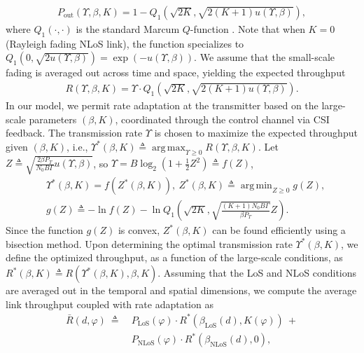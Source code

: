 \documentclass[10pt,twocolumn]{IEEEtran}
\DeclareMathOperator*{\argmax}{arg\,max}
\DeclareMathOperator*{\argmin}{arg\,min}
\begin{document}
\begin{align}
	P_{\mathrm{out}}(\Upsilon,\beta,K)=1-Q_{1}\left(\sqrt{2K},\sqrt{2(K+1)u(\Upsilon,\beta)}\right),
\end{align}
where $Q_{1}(\cdot,\cdot)$ is the standard Marcum $Q$-function \cite{Rician}. Note that when $K{=}0$ (Rayleigh fading NLoS link), the function specializes to $Q_{1}\left(0,\sqrt{2u(\Upsilon,\beta)}\right){=}\exp(-u(\Upsilon,\beta))$. We assume that the small-scale fading is averaged out across time and space, yielding the expected throughput
\begin{align}
	R(\Upsilon,\beta,K)=\Upsilon\cdot Q_{1}\left(\sqrt{2K},\sqrt{2(K+1)u(\Upsilon,\beta)}\right).
\end{align}
In our model, we permit rate adaptation at the transmitter based on the large-scale parameters $(\beta,K)$, coordinated through the control channel via CSI feedback. The transmission rate $\Upsilon$ is chosen to maximize the expected throughput given $(\beta,K)$, i.e., $\Upsilon^{*}(\beta,K){\triangleq}\argmax_{\Upsilon{\geq}0}R(\Upsilon,\beta,K)$. Let $Z{\triangleq}\sqrt{\frac{2{\beta}P_{T}}{N_{0}B\Gamma}u(\Upsilon,\beta)}$, so $\Upsilon{=}B\log_{2}\left(1{+}\frac{1}{2}Z^{2}\right){\triangleq}f(Z)$,
\begin{align}
    &\Upsilon^{*}(\beta,K){=}f(Z^{*}(\beta,K)),\ Z^{*}(\beta,K){\triangleq}\argmin_{Z{\geq}0}g(Z),\nonumber\\
    &g(Z){\triangleq}-\ln f(Z){-}\ln Q_{1}\left(\sqrt{2K},\sqrt{\frac{(K{+}1)N_{0}B\Gamma}{\beta P_{T}}}Z\right).
\end{align}
Since the function $g(Z)$ is convex, $Z^{*}(\beta,K)$ can be found efficiently using a bisection method. Upon determining the optimal transmission rate $\Upsilon^{*}(\beta,K)$, we define the optimized throughput, as a function of the large-scale conditions, as $R^{*}(\beta,K) \triangleq R(\Upsilon^{*}(\beta,K),\beta,K)$. Assuming that the LoS and NLoS conditions are averaged out in the temporal and spatial dimensions, we compute the average link throughput coupled with rate adaptation as
\begin{align}\label{TBar}
	\bar{R}(d,\varphi)\ \triangleq\ &P_{\mathrm{LoS}}(\varphi)\cdot R^{*}(\beta_{\mathrm{LoS}}(d),K(\varphi))\ +\nonumber\\
	&P_{\mathrm{NLoS}}(\varphi)\cdot R^{*}(\beta_{\mathrm{NLoS}}(d),0),
\end{align}
\end{document}
